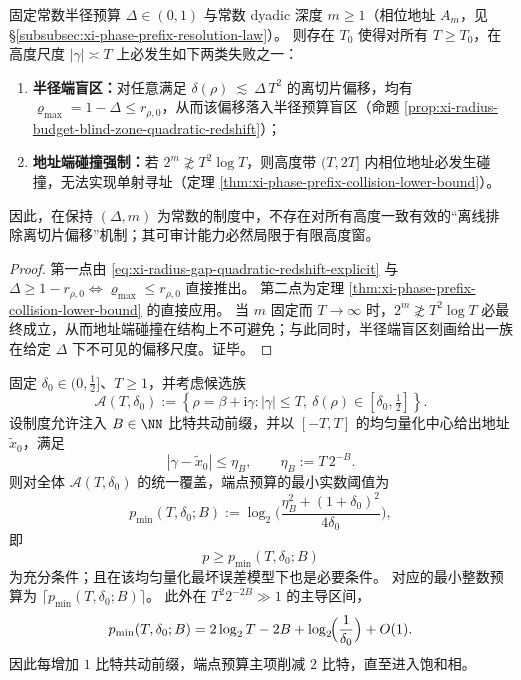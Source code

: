 \begin{corollary}\label{cor:xi-fixed-budget-incomplete-offcritical-exclusion}
固定常数半径预算 \(\Delta\in(0,1)\) 与常数 dyadic 深度 \(m\ge 1\)（相位地址 \(A_m\)，见 \S\ref{subsubsec:xi-phase-prefix-resolution-law}）。
则存在 \(T_0\) 使得对所有 \(T\ge T_0\)，在高度尺度 \(|\gamma|\asymp T\) 上必发生如下两类失败之一：
\begin{enumerate}
  \item \textbf{半径端盲区：}对任意满足
  \(
  \delta(\rho)\ \lesssim\ \Delta\,T^2
  \)
  的离切片偏移，均有 \(\varrho_{\max}=1-\Delta\le r_{\rho,0}\)，从而该偏移落入半径预算盲区（命题 \ref{prop:xi-radius-budget-blind-zone-quadratic-redshift}）；
  \item \textbf{地址端碰撞强制：}若 \(2^m\not\gtrsim T^2\log T\)，则高度带 \((T,2T]\) 内相位地址必发生碰撞，无法实现单射寻址（定理 \ref{thm:xi-phase-prefix-collision-lower-bound}）。
\end{enumerate}
因此，在保持 \((\Delta,m)\) 为常数的制度中，不存在对所有高度一致有效的“离线排除离切片偏移”机制；其可审计能力必然局限于有限高度窗。
\end{corollary}
\begin{proof}
第一点由 \eqref{eq:xi-radius-gap-quadratic-redshift-explicit} 与 \(\Delta\ge 1-r_{\rho,0}\iff \varrho_{\max}\le r_{\rho,0}\) 直接推出。
第二点为定理 \ref{thm:xi-phase-prefix-collision-lower-bound} 的直接应用。
当 \(m\) 固定而 \(T\to\infty\) 时，\(2^m\not\gtrsim T^2\log T\) 必最终成立，从而地址端碰撞在结构上不可避免；与此同时，半径端盲区刻画给出一族在给定 \(\Delta\) 下不可见的偏移尺度。证毕。
\end{proof}

\begin{theorem}[量化共动前缀下的端点屏障削减律]\label{thm:xi-comoving-prefix-endpoint-barrier-law}
固定 \(\delta_0\in(0,\tfrac12]\)、\(T\ge 1\)，并考虑候选族
\[
\mathcal{A}(T,\delta_0)
:=
\left\{
\rho=\beta+\mathrm{i}\gamma:
|\gamma|\le T,\ 
\delta(\rho)\in[\delta_0,\tfrac12]
\right\}.
\]
设制度允许注入 \(B\in\NN\) 比特共动前缀，并以 \([-T,T]\) 的均匀量化中心给出地址 \(\tilde x_0\)，满足
\[
|\gamma-\tilde x_0|
\le
\eta_B,
\qquad
\eta_B:=T\,2^{-B}.
\]
则对全体 \(\mathcal{A}(T,\delta_0)\) 的统一覆盖，端点预算的最小实数阈值为
\begin{equation}\label{eq:xi-comoving-prefix-pmin}
p_{\min}(T,\delta_0;B)
:=
\log_2\!\Biggl(
\frac{\eta_B^2+(1+\delta_0)^2}{4\delta_0}
\Biggr),
\end{equation}
即
\[
p\ge p_{\min}(T,\delta_0;B)
\]
为充分条件；且在该均匀量化最坏误差模型下也是必要条件。
对应的最小整数预算为 \(\lceil p_{\min}(T,\delta_0;B)\rceil\)。
此外在 \(T^2 2^{-2B}\gg 1\) 的主导区间，
\begin{equation}\label{eq:xi-comoving-prefix-pmin-asymptotic}
p_{\min}(T,\delta_0;B)
=
2\log_2 T-2B+\log_2\!\Bigl(\frac1{\delta_0}\Bigr)+O(1).
\end{equation}
因此每增加 \(1\) 比特共动前缀，端点预算主项削减 \(2\) 比特，直至进入饱和相。
\end{theorem}

